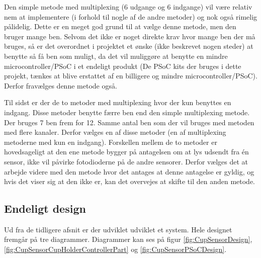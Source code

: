 \documentclass[HardwareDesign/HardwareDesign_main.tex]{subfiles}
\begin{document}
Den simple metode med multiplexing (6 udgange og 6 indgange) vil være relativ nem at implementere (i forhold til nogle af de andre metoder) og nok også rimelig pålidelig. Dette er en meget god grund til at vælge denne metode, men den bruger mange ben. Selvom det ikke er noget direkte krav hvor mange ben der må bruges, så er det overordnet i projektet et ønske (ikke beskrevet nogen steder) at benytte så få ben som muligt, da det vil muliggøre at benytte en mindre microcontroller/PSoC i et endeligt produkt (De PSoC kits der bruges i dette projekt, tænkes at blive erstattet af en billigere og mindre microcontroller/PSoC). Derfor fravælges denne metode også.

Til sidst er der de to metoder med multiplexing hvor der kun benyttes en indgang. Disse metoder benytte færre ben end den simple multiplexing metode. Der bruges 7 ben frem for 12. Samme antal ben som der vil bruges med metoden med flere kanaler. Derfor vælges en af disse metoder (en af multiplexing metoderne med kun en indgang). Forskellen mellem de to metoder er hovedsageligt at den ene metode bygger på antagelsen om at lys udsendt fra én sensor, ikke vil påvirke fotodioderne på de andre sensorer. Derfor vælges det at arbejde videre med den metode hvor det antages at denne antagelse er gyldig, og hvis det viser sig at den ikke er, kan det overvejes at skifte til den anden metode.
\newpage
\subsection{Endeligt design} \label{sec:CupSensorFinalDesign}
Ud fra de tidligere afsnit er der udviklet udviklet et system. Hele designet fremgår på tre diagrammer. Diagrammer kan ses på figur \ref{fig:CupSensorDesign}, \ref{fig:CupSensorCupHolderControllerPart} og \ref{fig:CupSensorPSoCDesign}.
\end{document}
